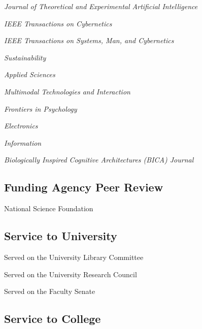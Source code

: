 \documentclass[12pt,letterpaper]{report}
\newcommand{\listitemspace}{0.25em}
\renewenvironment{itemize}
{\begin{list}{}{\setlength{\leftmargin}{0em}
                \setlength{\parskip}{0em}
                \setlength{\itemsep}{\listitemspace}
                \setlength{\parsep}{\listitemspace}}}
{\end{list}}
\begin{document}
    \begin{itemize}
        \item \textit{Journal of Theoretical and Experimental Artificial Intelligence}
        \item \textit{IEEE Transactions on Cybernetics}
        \item \textit{IEEE Transactions on Systems, Man, and Cybernetics}
        \item \textit{Sustainability}
        \item \textit{Applied Sciences}
        \item \textit{Multimodal Technologies and Interaction}
        \item \textit{Frontiers in Psychology}
        \item \textit{Electronics}
        \item \textit{Information}
        \item \textit{Biologically Inspired Cognitive Architectures (BICA) Journal}
    \end{itemize}

    \subsection*{Funding Agency Peer Review}

    \begin{itemize}

        \item National Science Foundation

    \end{itemize}

    \subsection*{Service to University}

    \begin{itemize}
        \item Served on the University Library Committee
        \item Served on the University Research Council
        \item Served on the Faculty Senate
    \end{itemize}

    \subsection*{Service to College}
\end{document}
